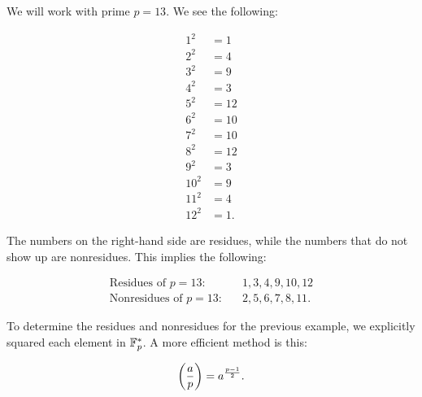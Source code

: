 \begin{example}

We will work with prime $p = 13$.
We see the following:

\begin{align}
    1^{2} &= 1
        \nonumber\\
    2^{2} &= 4
        \nonumber\\
    3^{2} &= 9
        \nonumber\\
    4^{2} &= 3
        \nonumber\\
    5^{2} &= 12
        \nonumber\\
    6^{2} &= 10
        \nonumber\\
    7^{2} &= 10
        \nonumber\\
    8^{2} &= 12
        \nonumber\\
    9^{2} &= 3
        \nonumber\\
    10^{2} &= 9
        \nonumber\\
    11^{2} &= 4
        \nonumber\\
    12^{2} &= 1.
\end{align}

\noindent
The numbers on the right-hand side are residues,
while the numbers that do not show up are nonresidues.
This implies the following:

\begin{align}
    \text{Residues of $p=13$:}
        &\quad 1, 3, 4, 9, 10, 12 \nonumber\\
    \text{Nonresidues of $p=13$:}
        &\quad 2, 5, 6, 7, 8, 11.
\end{align}
\end{example}

To determine the residues and nonresidues for the previous example,
we explicitly squared each element in $\mathbb{F}_{p}^{*}$.
A more efficient method is this:

\begin{equation}
    \left( \frac{a}{p} \right) = a^{\frac{p-1}{2}}.
    \label{eq:app_math_legendre_compute}
\end{equation}

